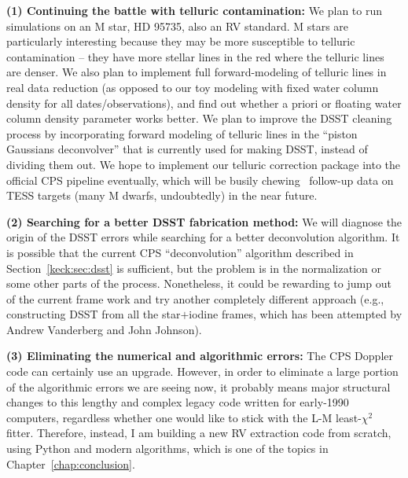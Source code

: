 {\bf (1) Continuing the battle with telluric contamination: } We plan
to run simulations on an M star, HD 95735, also an RV standard. M stars
are particularly interesting because they may be more susceptible to
telluric contamination -- they have more stellar lines in the red
where the telluric lines are denser. We also plan to implement full
forward-modeling of telluric lines in real data reduction (as opposed
to our toy modeling with fixed water column density for all
dates/observations), and find out whether a priori or floating water
column density parameter works better. We plan to improve the DSST
cleaning process by incorporating forward modeling of telluric lines
in the ``piston Gaussians deconvolver'' that is currently used for
making DSST, instead of dividing them out. We hope to implement our
telluric correction package into the official CPS pipeline eventually,
which will be busily chewing \keck\ follow-up data on TESS targets
(many M dwarfs, undoubtedly) in the near future.

{\bf (2) Searching for a better DSST fabrication method: } We will
diagnose the origin of the DSST errors while searching for a better
deconvolution algorithm. It is possible that the current CPS
``deconvolution'' algorithm described in Section~\ref{keck:sec:dsst}
is sufficient, but the problem is in the normalization or some other
parts of the process. Nonetheless, it could be rewarding to jump out
of the current frame work and try another completely different
approach (e.g., constructing DSST from all the star$+$iodine frames,
which has been attempted by Andrew Vanderberg and John Johnson).

{\bf (3) Eliminating the numerical and algorithmic errors: } The CPS
Doppler code can certainly use an upgrade. However, in order to
eliminate a large portion of the algorithmic errors we are seeing now,
it probably means major structural changes to this lengthy and complex
legacy code written for early-1990 computers, regardless whether one
would like to stick with the L-M least-$\chi^2$ fitter. Therefore,
instead, I am building a new RV extraction code from scratch, using
Python and modern algorithms, which is one of the topics in
Chapter~\ref{chap:conclusion}.



